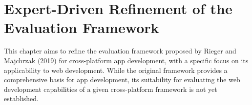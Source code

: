 \chapter{Expert-Driven Refinement of the Evaluation Framework}

This chapter aims to refine the evaluation framework proposed by Rieger and Majchrzak (2019) for cross-platform app development, with a specific focus on its applicability to web development. While the original framework provides a comprehensive basis for app development, its suitability for evaluating the web development capabilities of a given cross-platform framework is not yet established.


